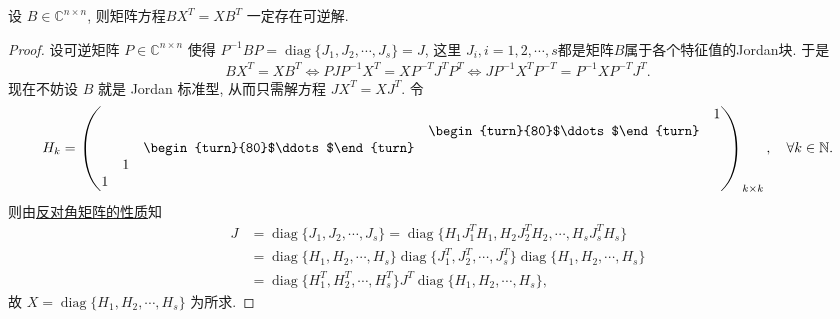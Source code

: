 \documentclass[../../main.tex]{subfiles}%
\begin{document}
\begin{lemma}\label{lemma:BX转置XB转置矩阵方程必有可逆解}
设 \( B \in \mathbb{C}^{n \times n} \), 则矩阵方程\( BX^T = XB^T \) 一定存在可逆解.
\end{lemma}
\begin{proof}
设可逆矩阵 \( P \in \mathbb{C}^{n \times n} \) 使得 \( P^{-1}BP = \operatorname{diag}\{J_1, J_2, \cdots, J_s\} = J \), 这里 \( J_i, i = 1, 2, \cdots, s \)都是矩阵$B$属于各个特征值的Jordan块. 于是
\begin{align*}
BX^T = XB^T \iff PJP^{-1}X^T = XP^{-T}J^T P^T 
\iff JP^{-1}X^T P^{-T} = P^{-1}XP^{-T}J^T.
\end{align*}
现在不妨设 \( B \) 就是 Jordan 标准型, 从而只需解方程 \( JX^T = XJ^T \). 令
\begin{align*}
H_k = \begin{pmatrix}
& & & & 1 \\
& & & \begin{turn}{80}$\ddots$\end{turn} & \\
& & \begin{turn}{80}$\ddots$\end{turn} & & \\
& 1 & & & \\
1 & & & &
\end{pmatrix}_{k\times k},\quad \forall k\in \mathbb{N}.
\end{align*}
则由\hyperref[lemma:反对角矩阵的性质]{反对角矩阵的性质}知
\begin{align*}
J &= \operatorname{diag}\{J_1, J_2, \cdots, J_s\} = \operatorname{diag}\{H_1J_1^T H_1, H_2J_2^T H_2, \cdots, H_sJ_s^T H_s\} \\
&= \operatorname{diag}\{H_1, H_2, \cdots, H_s\} \operatorname{diag}\{J_1^T, J_2^T, \cdots, J_s^T\} \operatorname{diag}\{H_1, H_2, \cdots, H_s\} \\
&= \operatorname{diag}\{H_1^T, H_2^T, \cdots, H_s^T\} J^T \operatorname{diag}\{H_1, H_2, \cdots, H_s\},
\end{align*}
故 \( X = \operatorname{diag}\{H_1, H_2, \cdots, H_s\} \) 为所求.
\end{proof}
\end{document}

